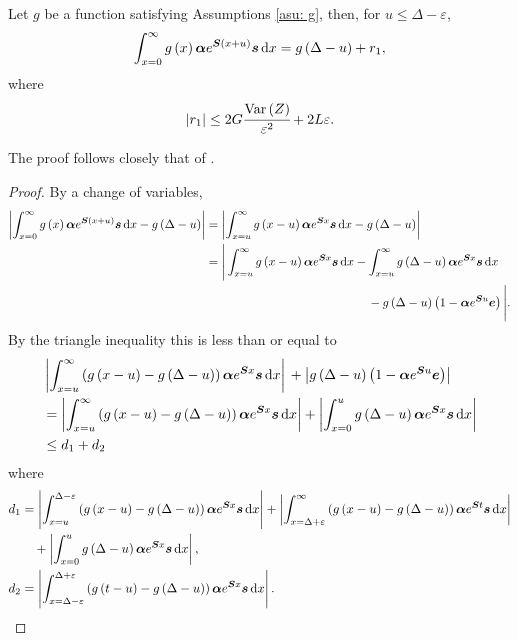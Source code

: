 \begin{lem}\label{lemma:bound}
	Let \(g\) be a function satisfying Assumptions \ref{asu: g}, then, for \(u \leq \Delta - \varepsilon\), 
	\begin{align*}
		\int_{x=0}^\infty g\left(x\right)\boldsymbol \alpha e^{\boldsymbol{S}\left(x+u\right)} \boldsymbol s \, \mathrm{d} x = g\left(\Delta-u\right) + r_1,
	\end{align*}
	where 
	\[\left|r_1\right|\leq 2G\cfrac{\mathrm{Var} \left(Z\right)}{\varepsilon^2} + 2L\varepsilon.\]
\end{lem}
The proof follows closely that of \cite[Appendix A, Theorem 4]{hhat2020}.
\begin{proof}
	By a change of variables, 
	\begin{align*}
		\left|\int_{x=0}^\infty g\left(x\right)\bs \alpha  e^{\bs{S} \left(x+u\right)} \bs s \wrt x - g\left(\Delta-u\right)\right| 
		&= \left|\int_{x=u}^\infty g\left(x-u\right)\bs \alpha  e^{\bs{S} x} \bs s \wrt x - g\left(\Delta-u\right)\right| 
		\\&\begin{multlined}[t]= \Bigg|\int_{x=u}^\infty g\left(x-u\right)\bs \alpha  e^{\bs{S} x} \bs s \wrt x - \int_{x=u}^\infty g\left(\Delta-u\right)\bs\alpha  e^{\bs{S} x}\bs s\wrt x \\ {}- g\left(\Delta-u\right)\left(1-\bs\alpha  e^{\bs{S} u}\bs e \right)\Bigg|.\end{multlined}
	\end{align*}
	{By the triangle inequality this is less than or equal to}
	\begin{align*}
		&\left|\int_{x=u}^\infty \left(g\left(x-u\right)- g\left(\Delta-u\right)\right)\boldsymbol \alpha  e^{\boldsymbol{S} x} \boldsymbol s \, \mathrm{d} x \right| 
		{}+ \left|g\left(\Delta-u\right)\left(1-\boldsymbol\alpha  e^{\boldsymbol{S} u}\boldsymbol e \right)\right|
		\\&= \left|\int_{x=u}^\infty \left(g\left(x-u\right)- g\left(\Delta-u\right)\right)\boldsymbol \alpha  e^{\boldsymbol{S} x} \boldsymbol s \, \mathrm{d} x\right| 
		+ \left|\int_{x=0}^u g\left(\Delta-u\right)\boldsymbol \alpha  e^{\boldsymbol{S} x} \boldsymbol s \, \mathrm{d} x \right| 
		\\&\leq d_1 +{d_2} 
	\end{align*}
	where 
	\begin{align*}
		d_1 &= \left|\int_{x=u}^{\Delta-\varepsilon } \left(g\left(x-u\right)- g\left(\Delta-u\right)\right)\boldsymbol \alpha  e^{\boldsymbol{S} x} \boldsymbol s \, \mathrm{d} x \right| + \left|\int_{x=\Delta+\varepsilon }^{\infty} \left(g\left(x-u\right)- g\left(\Delta-u\right)\right)\boldsymbol \alpha  e^{\boldsymbol{S} t} \boldsymbol s \, \mathrm{d} x \right|
		\\&\quad{}+ \left|\int_{x=0}^u g\left(\Delta-u\right)\boldsymbol \alpha  e^{\boldsymbol{S} x} \boldsymbol s \, \mathrm{d} x\right|,
	\\{d_2} &= \left|\int_{x=\Delta-\varepsilon }^{\Delta+\varepsilon } \left(g\left(t-u\right)- g\left(\Delta-u\right)\right)\boldsymbol \alpha  e^{\boldsymbol{S} x} \boldsymbol s \, \mathrm{d} x\right| .
	\end{align*}
	

\end{proof}
